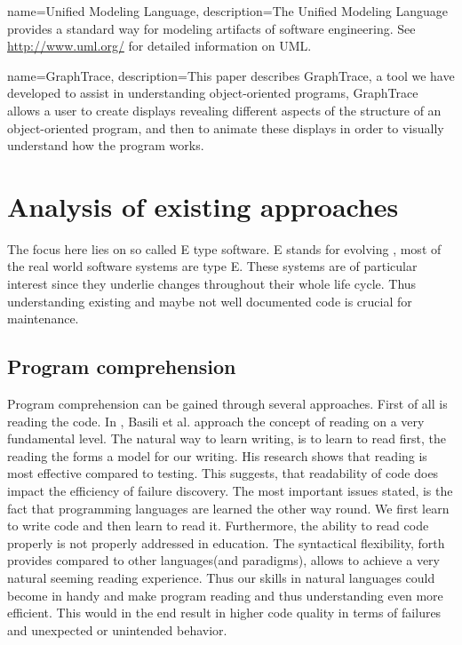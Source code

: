 {
  name={Unified Modeling Language},
  description={The Unified Modeling Language provides a standard way for modeling artifacts of software engineering. See \url{http://www.uml.org/} for detailed information on UML.}
}

{
  name={GraphTrace},
  description={This paper describes GraphTrace, a tool we have developed to assist in understanding object-oriented programs, GraphTrace allows a user to create displays revealing different aspects of the structure of an object-oriented program, and then to animate these displays in order to visually understand how the program works.}
}

\chapter{Analysis of existing approaches}
\label{chap:StateOfTheArt}

The focus here lies on so called E type software. E stands for evolving \cite{Cook:2006:ESS:1115566.1115567}, most of the real world software systems are type E. These systems are of particular interest since they underlie changes throughout their whole life cycle. Thus understanding existing and maybe not well documented code is crucial for maintenance.

\section{Program comprehension}

Program comprehension can be gained through several approaches. First of all is reading the code.
In \cite{Basili:1997:EPR:257260.257262}, Basili et al. approach the concept of reading on a very fundamental level. The natural way to learn writing, is to learn to read first, the reading the forms a model for our writing.  His research shows that reading is most effective compared to testing. This suggests, that readability of code does impact the efficiency of failure discovery. The most important issues stated, is the fact that programming languages are learned the other way round. We first learn to write code and then learn to read it. Furthermore, the ability to read code properly is not properly addressed in education. The syntactical flexibility, forth provides compared to other languages(and paradigms), allows to achieve a very natural seeming reading experience. Thus our skills in natural languages could become in handy and make program reading and thus understanding even more efficient. This would in the end result in higher code quality in terms of failures and unexpected or unintended behavior.

